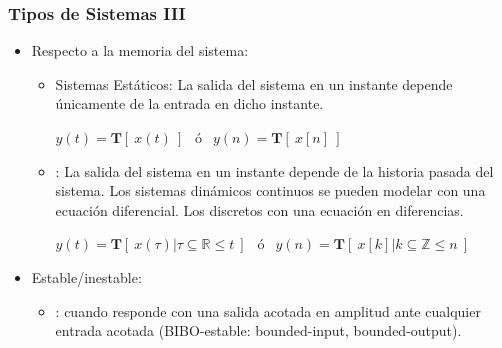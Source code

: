
\begin{frame}
\frametitle{Tipos de Sistemas III}

\vspace{-0,1cm}

\begin{figure}
  \centering
  \small
  \end{figure}

  \vspace{-0.25cm}
  \begin{itemize}
    \item <1-> Respecto a la memoria del sistema:
    \begin{itemize}
      \item \alert{Sistemas Estáticos}: La salida del sistema en un instante depende únicamente de la entrada en dicho instante. 
  
      \vspace{0.1cm}
      \hspace{1cm}    $y(t)=\bm{T}[\:x(t)\:] \: \:$       ó          $\: \:y(n)=\bm{T}[\:x[n]\:]$ 
  
      \vspace{0.1cm}    
      \item \color{olivegreen}{Sistemas Dinámicos}\color{black}: La salida del sistema en un instante depende de la historia pasada del sistema. Los sistemas dinámicos continuos se pueden modelar con una ecuación diferencial. Los discretos con una ecuación en diferencias.

      \vspace{0.1cm}

      $y(t)=\bm{T}[\:x(\tau) | \tau \subseteq \mathbb{R} \le t\:] \: \:$       ó          $\: \:y(n)=\bm{T}[\:x[k] | k \subseteq \mathbb{Z} \le n\:]$
      \vspace{0.1cm}
 
    \end{itemize}

    \item <2-> Estable/inestable:
    \begin{itemize}
      \item \color{olivegreen}{Sistemas Estables}\color{black}: cuando responde con una salida acotada en amplitud ante cualquier entrada acotada (BIBO-estable: bounded-input, bounded-output). 


\end{itemize}
\end{itemize}
\end{frame}
